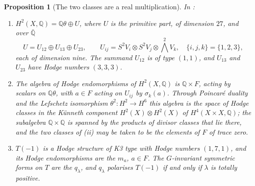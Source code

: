 \documentclass[11pt,reqno]{amsart}
\theoremstyle{plain}
\newtheorem{proposition}[theorem]{Proposition}
\theoremstyle{definition}
\theoremstyle{remark}
\newcommand{\QQ}{\mathbb{Q}}
\begin{document}
\begin{proposition}[The two classes are a real multiplication]%
\label{prop:mumfordrm}
In :
\begin{enumerate}[label=\textup{(\roman*)},nosep,leftmargin=2.6em]
\item $H^{2}(X,\QQ)=\QQ\theta\oplus U$, where $U$ is the primitive part, of
  dimension $27$, and over $\bar{\QQ}$
  \[
    U=U_{12}\oplus U_{13}\oplus U_{23},\qquad
    U_{ij}=S^{2}V_{i}\otimes S^{2}V_{j}\otimes{\textstyle\bigwedge^{2}}V_{k},
    \quad \{i,j,k\}=\{1,2,3\},
  \]
  each of dimension nine. The summand $U_{12}$ is of type $(1,1)$, and
  $U_{13}$ and $U_{23}$ have Hodge numbers $(3,3,3)$.
\item The algebra of Hodge endomorphisms of $H^{2}(X,\QQ)$ is $\QQ\times F$,
  acting by scalars on $\QQ\theta$, with $a\in F$ acting on $U_{ij}$ by
  $\sigma_{k}(a)$. Through Poincar\'e duality and the Lefschetz isomorphism
  $\theta^{2}\colon H^{2}\to H^{6}$ this algebra is the space of Hodge classes
  in the K\"unneth component $H^{2}(X)\otimes H^{2}(X)$ of
  $H^{4}(X\times X,\QQ)$; the subalgebra $\QQ\times\QQ$ is spanned by the
  products of divisor classes that lie there, and the two classes of
  (ii) may be taken to be the elements of $F$ of
  trace zero.
\item $T(-1)$ is a Hodge structure of K3 type with Hodge numbers $(1,7,1)$,
  and its Hodge endomorphisms are the $m_{a}$, $a\in F$. The $G$-invariant
  symmetric forms on $T$ are the $q_{\lambda}$, and $q_{\lambda}$ polarises
  $T(-1)$ if and only if $\lambda$ is totally positive.
\end{enumerate}
\end{proposition}
\end{document}
